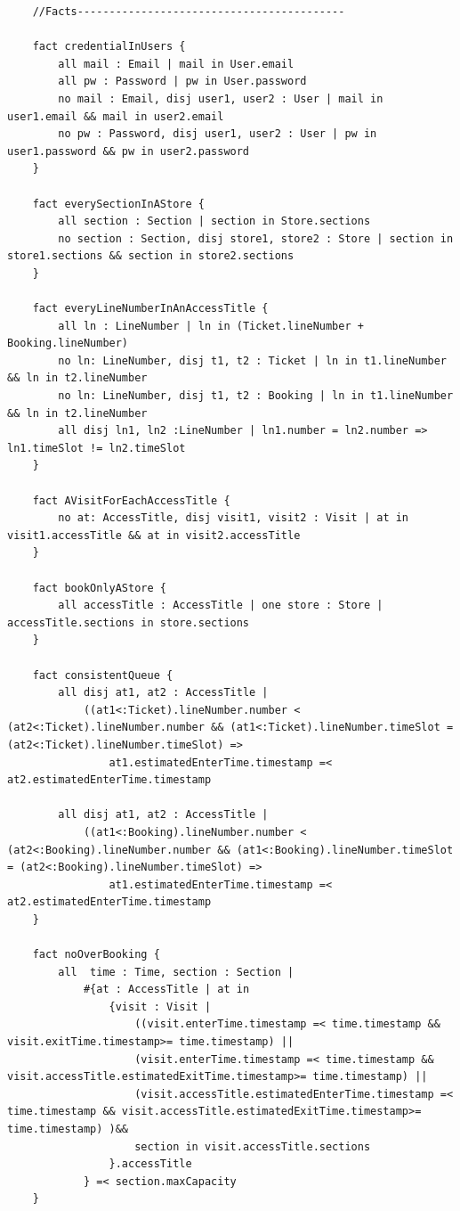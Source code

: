 \begin{lstlisting}
    //Facts------------------------------------------

    fact credentialInUsers {
        all mail : Email | mail in User.email
        all pw : Password | pw in User.password
        no mail : Email, disj user1, user2 : User | mail in user1.email && mail in user2.email
        no pw : Password, disj user1, user2 : User | pw in user1.password && pw in user2.password
    }

    fact everySectionInAStore {
        all section : Section | section in Store.sections
        no section : Section, disj store1, store2 : Store | section in store1.sections && section in store2.sections
    }

    fact everyLineNumberInAnAccessTitle {
        all ln : LineNumber | ln in (Ticket.lineNumber + Booking.lineNumber)
        no ln: LineNumber, disj t1, t2 : Ticket | ln in t1.lineNumber && ln in t2.lineNumber
        no ln: LineNumber, disj t1, t2 : Booking | ln in t1.lineNumber && ln in t2.lineNumber
        all disj ln1, ln2 :LineNumber | ln1.number = ln2.number => ln1.timeSlot != ln2.timeSlot
    }

    fact AVisitForEachAccessTitle {
        no at: AccessTitle, disj visit1, visit2 : Visit | at in visit1.accessTitle && at in visit2.accessTitle
    }

    fact bookOnlyAStore {
        all accessTitle : AccessTitle | one store : Store | accessTitle.sections in store.sections
    }

    fact consistentQueue {
        all disj at1, at2 : AccessTitle |
            ((at1<:Ticket).lineNumber.number < (at2<:Ticket).lineNumber.number && (at1<:Ticket).lineNumber.timeSlot = (at2<:Ticket).lineNumber.timeSlot) =>
                at1.estimatedEnterTime.timestamp =< at2.estimatedEnterTime.timestamp

        all disj at1, at2 : AccessTitle |
            ((at1<:Booking).lineNumber.number < (at2<:Booking).lineNumber.number && (at1<:Booking).lineNumber.timeSlot = (at2<:Booking).lineNumber.timeSlot) =>
                at1.estimatedEnterTime.timestamp =< at2.estimatedEnterTime.timestamp
    }

    fact noOverBooking {
        all  time : Time, section : Section |
            #{at : AccessTitle | at in
                {visit : Visit |
                    ((visit.enterTime.timestamp =< time.timestamp && visit.exitTime.timestamp>= time.timestamp) ||
                    (visit.enterTime.timestamp =< time.timestamp && visit.accessTitle.estimatedExitTime.timestamp>= time.timestamp) ||
                    (visit.accessTitle.estimatedEnterTime.timestamp =< time.timestamp && visit.accessTitle.estimatedExitTime.timestamp>= time.timestamp) )&&
                    section in visit.accessTitle.sections
                }.accessTitle
            } =< section.maxCapacity
    }


\end{lstlisting}
